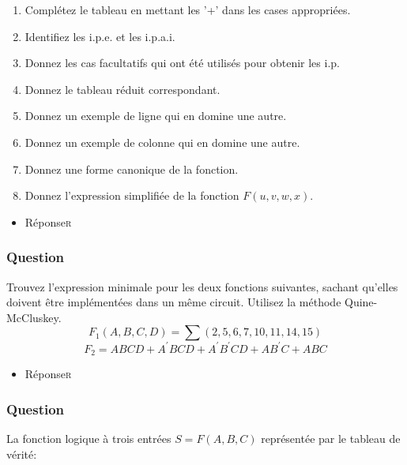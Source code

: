 \documentclass[11pt]{article}
\begin{document}
\begin{enumerate}
\item Complétez le tableau en mettant les '+' dans les cases
appropriées.

\item Identifiez les i.p.e. et les i.p.a.i.

\item Donnez les cas facultatifs qui ont été utilisés pour obtenir les
i.p.

\item Donnez le tableau réduit correspondant.

\item Donnez un exemple de ligne qui en domine une autre.

\item Donnez un exemple de colonne qui en domine une autre.

\item Donnez une forme canonique de la fonction.

\item Donnez l'expression simplifiée de la fonction \(F(u,v,w,x)\).
\end{enumerate}


\begin{itemize}
\item Réponse\hfill{}\textsc{r}
\label{sec:org53695ee}
\end{itemize}

\subsubsection*{Question}
\label{sec:orga34814c}
Trouvez l'expression minimale pour les deux fonctions suivantes,
   sachant qu'elles doivent être implémentées dans un même
   circuit. Utilisez la méthode Quine-McCluskey.
   $$
     F_1(A, B, C, D)
     =\sum(2,5,6,7,10,11,14,15)
     $$
   $$
     F_2 = A B C D + A^\prime B C D +
     A^\prime B^\prime C D + A B^\prime C + ABC
     $$

\begin{itemize}
\item Réponse\hfill{}\textsc{r}
\label{sec:orgcad3588}
\end{itemize}

\subsubsection*{Question}
\label{sec:org4ca3f1c}
La fonction logique à trois entrées \(S = F(A,B,C)\) représentée par le
  tableau de vérité:
\end{document}
